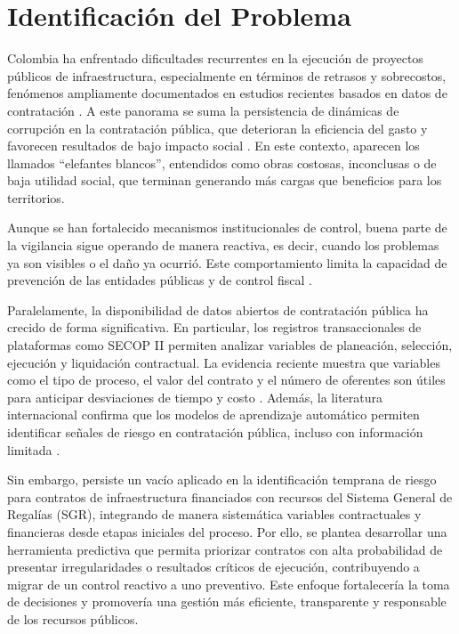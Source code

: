 \section{Identificación del Problema}

Colombia ha enfrentado dificultades recurrentes en la ejecución de proyectos públicos de infraestructura, especialmente en términos de retrasos y sobrecostos, fenómenos ampliamente documentados en estudios recientes basados en datos de contratación \cite{gomez2025data,gomez2025analyzing}. A este panorama se suma la persistencia de dinámicas de corrupción en la contratación pública, que deterioran la eficiencia del gasto y favorecen resultados de bajo impacto social \cite{sierra2025contratacion,lyra2022fraud}. En este contexto, aparecen los llamados ``elefantes blancos'', entendidos como obras costosas, inconclusas o de baja utilidad social, que terminan generando más cargas que beneficios para los territorios.

Aunque se han fortalecido mecanismos institucionales de control, buena parte de la vigilancia sigue operando de manera reactiva, es decir, cuando los problemas ya son visibles o el daño ya ocurrió. Este comportamiento limita la capacidad de prevención de las entidades públicas y de control fiscal \cite{ospina2024percepcion,sierra2025contratacion}.

Paralelamente, la disponibilidad de datos abiertos de contratación pública ha crecido de forma significativa. En particular, los registros transaccionales de plataformas como SECOP II permiten analizar variables de planeación, selección, ejecución y liquidación contractual. La evidencia reciente muestra que variables como el tipo de proceso, el valor del contrato y el número de oferentes son útiles para anticipar desviaciones de tiempo y costo \cite{gomez2025data,gomez2025analyzing}. Además, la literatura internacional confirma que los modelos de aprendizaje automático permiten identificar señales de riesgo en contratación pública, incluso con información limitada \cite{decarolis2022corruption,tas2024machine}.

Sin embargo, persiste un vacío aplicado en la identificación temprana de riesgo para contratos de infraestructura financiados con recursos del Sistema General de Regalías (SGR), integrando de manera sistemática variables contractuales y financieras desde etapas iniciales del proceso. Por ello, se plantea desarrollar una herramienta predictiva que permita priorizar contratos con alta probabilidad de presentar irregularidades o resultados críticos de ejecución, contribuyendo a migrar de un control reactivo a uno preventivo. Este enfoque fortalecería la toma de decisiones y promovería una gestión más eficiente, transparente y responsable de los recursos públicos.
